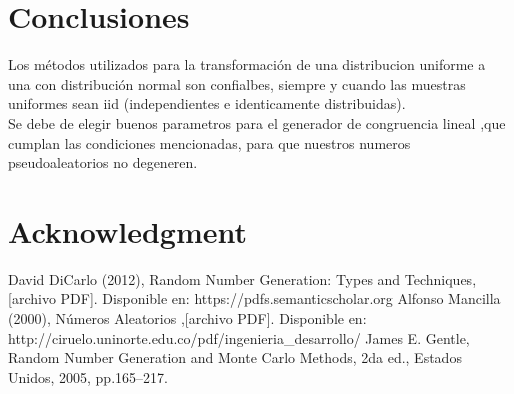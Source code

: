 \documentclass[conference,a4paper]{IEEEtran}
\begin{document}
\section{Conclusiones}
Los m\'etodos utilizados para la transformaci\'on de una distribucion uniforme a una con distribuci\'on normal son confialbes, siempre y cuando las muestras uniformes sean iid (independientes e identicamente distribuidas).\\

Se debe de elegir buenos parametros para el generador de congruencia lineal ,que cumplan las condiciones mencionadas, para que nuestros numeros pseudoaleatorios no degeneren.\\
\section*{Acknowledgment}



\begin{thebibliography}{00}
 David DiCarlo (2012), Random Number Generation: Types and Techniques, [archivo PDF]. Disponible en: https://pdfs.semanticscholar.org
 Alfonso Mancilla (2000), N\'umeros Aleatorios ,[archivo PDF]. Disponible en: http://ciruelo.uninorte.edu.co/pdf/ingenieria\_desarrollo/
 James E. Gentle, Random Number Generation and Monte Carlo Methods, 2da ed., Estados Unidos, 2005, pp.165--217.

\end{thebibliography}
\vspace{12pt}
\end{document}
